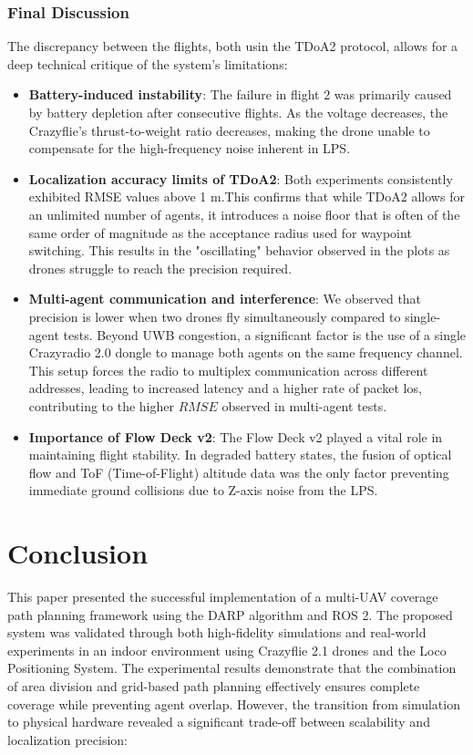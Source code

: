 \documentclass[conference]{IEEEtran}
\begin{document}
\subsubsection{Final Discussion}

The discrepancy between the flights, both usin the TDoA2 protocol, allows for a deep technical critique of the system's limitations:
 
\begin{itemize}
    \item \textbf{Battery-induced instability}: The failure in flight 2 was primarily caused by battery depletion after consecutive flights.  As the voltage decreases, the Crazyflie's thrust-to-weight ratio decreases, making the drone unable to compensate for the high-frequency noise inherent in LPS.
    \item \textbf{Localization accuracy limits of TDoA2}: Both experiments consistently exhibited RMSE values above 1 m.This confirms that while TDoA2 allows for an unlimited number of agents, it introduces a noise floor that is often of the same order of magnitude as the acceptance radius used for waypoint switching. This results in the "oscillating" behavior observed in the plots as drones struggle to reach the precision required.
    \item \textbf{Multi-agent communication and interference}: We observed that precision is lower when two drones fly simultaneously compared to single-agent tests. Beyond UWB congestion, a significant factor is the use of a single Crazyradio 2.0 dongle to manage both agents on the same frequency channel. This setup forces the radio to multiplex communication across different addresses, leading to increased latency and a higher rate of packet los, contributing to the higher $RMSE$ observed in multi-agent tests.
    \item \textbf{Importance of Flow Deck v2}: The Flow Deck v2 played a vital role in maintaining flight stability. In degraded battery states, the fusion of optical flow and ToF (Time-of-Flight) altitude data was the only factor preventing immediate ground collisions due to Z-axis noise from the LPS.
\end{itemize}

\section{Conclusion}
This paper presented the successful implementation of a multi-UAV coverage path planning framework using the DARP algorithm and ROS 2. The proposed system was validated through both high-fidelity simulations and real-world experiments in an indoor environment using Crazyflie 2.1 drones and the Loco Positioning System.
The experimental results demonstrate that the combination of area division and grid-based path planning effectively ensures complete coverage while preventing agent overlap. However, the transition from simulation to physical hardware revealed a significant trade-off between scalability and localization precision:
\end{document}

